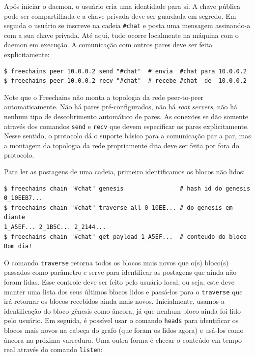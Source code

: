 \documentclass[12pt]{article}
\newcommand{\FC} {Freechains\xspace}
\begin{document}
Após iniciar o daemon, o usuário cria uma identidade para si.
A chave pública pode ser compartilhada e a chave privada deve ser guardada em
segredo.
Em seguida o usuário se inscreve na cadeia \texttt{\#chat} e posta uma mensagem
assinando-a com a sua chave privada.
Até aqui, tudo ocorre localmente na máquina com o daemon em execução.
A comunicação com outros pares deve ser feita explicitamente:

{\footnotesize
\begin{verbatim}
$ freechains peer 10.0.0.2 send "#chat"  # envia  #chat para 10.0.0.2
$ freechains peer 10.0.0.2 recv "#chat"  # recebe #chat  de  10.0.0.2
\end{verbatim}
}

Note que o \FC não monta a topologia da rede peer-to-peer automaticamente.
Não há pares pré-configurados, não há \emph{root servers}, não há nenhum tipo
de descobrimento automático de pares.
As conexões se dão somente através dos comandos \texttt{send} e \texttt{recv}
que devem especificar os pares explicitamente.
Nesse sentido, o protocolo dá o suporte básico para a comunicação par a par,
mas a montagem da topologia da rede propriamente dita deve ser feita por fora
do protocolo.

Para ler as postagens de uma cadeia, primeiro identificamos os blocos não
lidos:

{\footnotesize
\begin{verbatim}
$ freechains chain "#chat" genesis                # hash id do genesis
0_10EEB7...
$ freechains chain "#chat" traverse all 0_10EE... # do genesis em diante
1_A5EF... 2_1B5C... 2_2144...
$ freechains chain "#chat" get payload 1_A5EF...  # conteudo do bloco
Bom dia!
\end{verbatim}
}

O comando \texttt{traverse} retorna todos os blocos mais novos que o(s)
bloco(s) passados como parâmetro e serve para identificar as postagens que
ainda não foram lidas.
Esse controle deve ser feito pelo usuário local, ou seja, este deve manter uma
lista dos seus últimos blocos lidos e passá-los para o \texttt{traverse} que
irá retornar os blocos recebidos ainda mais novos.
Inicialmente, usamos a identificação do bloco gênesis como âncora, já que
nenhum bloco ainda foi lido pelo usuário.
Em seguida, é possível usar o comando \texttt{heads} para identificar os blocos
mais novos na cabeça do grafo (que foram os lidos agora) e usá-los como âncora
na próxima varredura.
%
Uma outra forma é checar o conteúdo em tempo real através do comando
\texttt{listen}:
\end{document}
